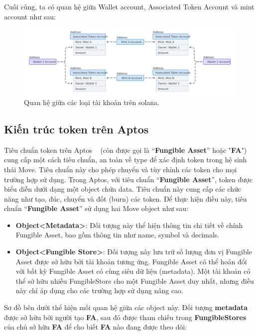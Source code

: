 \hspace{-1cm}Cuối cùng, ta có quan hệ giữa Wallet account, Associated Token
Account và mint account như sau:

\begin{figure}[h!]
    \begin{center}

        \includegraphics[width=1\textwidth]{figures/c1/token-account-relationship-ata.png}
        \caption{Quan hệ giữa các loại tài khoản trên solana.~\cite{SPL}}
        \label{fig:feature_interaction_example}
    \end{center}
\end{figure}

\subsection{Kiến trúc token trên Aptos}
Tiêu chuẩn token trên Aptos ~\cite{FA} (còn được gọi là “\textbf{Fungible
    Asset}” hoặc "\textbf{FA}") cung cấp một cách tiêu chuẩn, an toàn về type
để
xác định token trong hệ sinh thái Move. Tiêu chuẩn này cho phép chuyển và tùy
chỉnh các token cho mọi trường hợp sử dụng. Trong Aptos, với tiêu chuẩn
“\textbf{Fungible Asset}”, token được biểu diễn dưới dạng một object chứa data.
Tiêu chuẩn này cung cấp các chức năng như tạo, đúc, chuyển và đốt (burn) các
token. Để thực hiện điều này, tiêu chuẩn “\textbf{Fungible Asset}” sử dụng hai
Move object như sau:
\begin{itemize}
    \item \textbf{Object<Metadata>}: Đối tượng này thể hiện thông tin chi tiết
          về chính Fungible Asset, bao gồm thông tin như name, symbol và
          decimals.

    \item \textbf{Object<Fungible Store>}: Đối tượng này lưu trữ số lượng đơn
          vị Fungible Asset được sở hữu bởi tài khoản tương ứng. Fungible Asset
          có thể
          hoán đổi với bất kỳ Fungible Asset có cùng siêu dữ liệu (metadata).
          Một tài
          khoản có thể sở hữu nhiều FungibleStore cho một Fungible Asset duy
          nhất, nhưng
          điều này chỉ áp dụng cho các trường hợp sử dụng nâng cao.

\end{itemize}
Sơ đồ bên dưới thể hiện mối quan hệ giữa các object này. Đối tượng
\textbf{metadata} được sở hữu bởi người tạo \textbf{FA}, sau đó được tham chiếu
trong \textbf{FungibleStores} của chủ sở hữu \textbf{FA} để cho biết
\textbf{FA} nào đang được theo dõi:

